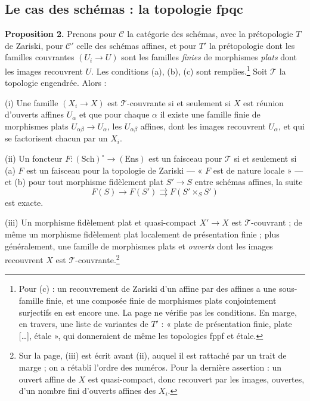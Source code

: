 \documentclass[11pt,a4paper]{article}
\begin{document}
\subsection*{Le cas des schémas : la topologie fpqc}

\textbf{Proposition 2.} Prenons pour $\mathcal{C}$ la catégorie des schémas,
avec la prétopologie $T$ de Zariski, pour $\mathcal{C}'$ celle des schémas
affines, et pour $T'$ la prétopologie dont les familles couvrantes $(U_i \to
U)$ sont les familles \emph{finies} de morphismes \emph{plats} dont les images
recouvrent $U$. Les conditions (a), (b), (c) sont remplies.\footnote{Pour (c) :
un recouvrement de Zariski d'un affine par des affines a une sous-famille
finie, et une composée finie de morphismes plats conjointement surjectifs en
est encore une. La page ne vérifie pas les conditions. En marge, en travers,
une liste de variantes de $T'$ : « plate de présentation finie, plate […],
étale », qui donneraient de même les topologies fppf et étale.} Soit
$\mathcal{T}$ la topologie engendrée. Alors :

(i) Une famille $(X_i \to X)$ est $\mathcal{T}$-couvrante si et seulement si
$X$ est réunion d'ouverts affines $U_\alpha$ et que pour chaque $\alpha$ il
existe une famille finie de morphismes plats $U_{\alpha\beta} \to U_\alpha$,
les $U_{\alpha\beta}$ affines, dont les images recouvrent $U_\alpha$, et qui
se factorisent chacun par un $X_i$.

(ii) Un foncteur $F : (\mathrm{Sch})^{\circ} \to (\mathrm{Ens})$ est un
faisceau pour $\mathcal{T}$ si et seulement si (a) $F$ est un faisceau pour la
topologie de Zariski — « $F$ est de nature locale » — et (b) pour tout
morphisme fidèlement plat $S' \to S$ entre schémas affines, la suite
\[
  F(S) \to F(S') \rightrightarrows F(S' \times_S S')
\]
est exacte.

(iii) Un morphisme fidèlement plat et quasi-compact $X' \to X$ est
$\mathcal{T}$-couvrant ; de même un morphisme fidèlement plat localement de
présentation finie ; plus généralement, une famille de morphismes plats et
\emph{ouverts} dont les images recouvrent $X$ est
$\mathcal{T}$-couvrante.\footnote{Sur la page, (iii) est écrit avant (ii),
auquel il est rattaché par un trait de marge ; on a rétabli l'ordre des
numéros. Pour la dernière assertion : un ouvert affine de $X$ est
quasi-compact, donc recouvert par les images, ouvertes, d'un nombre fini
d'ouverts affines des $X_i$.}
\end{document}
